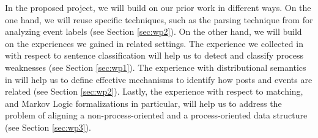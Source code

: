 

In the proposed project, we will build on our prior work in different ways. On the one hand, we will reuse specific techniques, such as the parsing technique from \cite{leopold2019using} for analyzing event labels (see Section \ref{sec:wp2}). On the other hand, we will build on the experiences we gained in related settings. The experience we collected in \cite{van2017transforming} with respect to sentence classification will help us to detect and classify process weaknesses (see Section \ref{sec:wp1}). The experience with distributional semantics in \cite{leopold2015towards} will help us to define effective mechanisms to identify how posts and events are related (see Section \ref{sec:wp2}). Lastly, the experience with respect to matching, and Markov Logic formalizations in particular, will help us to address the problem of aligning a non-process-oriented and a process-oriented data structure (see Section \ref{sec:wp3}).  
